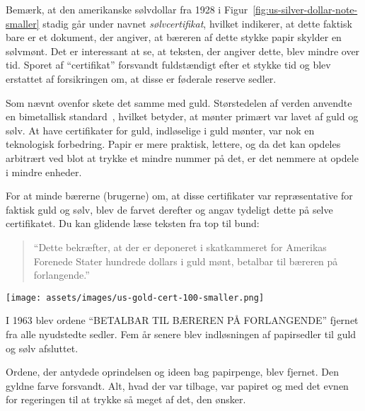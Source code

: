 Bemærk, at den amerikanske sølvdollar fra 1928 i
Figur~\ref{fig:us-silver-dollar-note-smaller} stadig går under navnet
\textit{sølvcertifikat}, hvilket indikerer, at dette faktisk bare er et dokument,
der angiver, at bæreren af dette stykke papir skylder en sølvmønt. Det er
interessant at se, at teksten, der angiver dette, blev mindre over tid. Sporet
af \enquote{certifikat} forsvandt fuldstændigt efter et stykke tid og blev erstattet
af forsikringen om, at disse er føderale reserve sedler.

Som nævnt ovenfor skete det samme med guld. Størstedelen af verden anvendte en
bimetallisk standard~\cite{wiki:bimetallism}, hvilket betyder, at mønter primært
var lavet af guld og sølv. At have certifikater for guld, indløselige i
guld mønter, var nok en teknologisk forbedring. Papir er mere praktisk,
lettere, og da det kan opdeles arbitrært ved blot at trykke et mindre
nummer på det, er det nemmere at opdele i mindre enheder.

For at minde bærerne (brugerne) om, at disse certifikater var
repræsentative for faktisk guld og sølv, blev de farvet derefter
og angav tydeligt dette på selve certifikatet. Du kan glidende læse
teksten fra top til bund:

\begin{quotation}\begin{samepage}
  \enquote{Dette bekræfter, at der er deponeret i skatkammeret for
  Amerikas Forenede Stater hundrede dollars i guld mønt, betalbar til
  bæreren på forlangende.}
\end{samepage}\end{quotation}
  
\begin{center}
  \centering
  \texttt{[image: assets/images/us-gold-cert-100-smaller.png]}
  \label{fig:us-gold-cert-100-smaller}
\end{center}

I 1963 blev ordene \enquote{BETALBAR TIL BÆREREN PÅ FORLANGENDE} fjernet fra
alle nyudstedte sedler. Fem år senere blev indløsningen af papirsedler
til guld og sølv afsluttet.

Ordene, der antydede oprindelsen og ideen bag papirpenge, blev
fjernet. Den gyldne farve forsvandt. Alt, hvad der var tilbage, var papiret
og med det evnen for regeringen til at trykke så meget af det, den ønsker.

